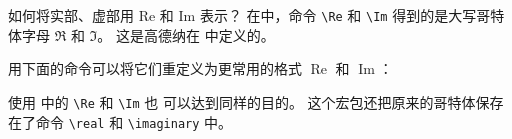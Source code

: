 \begin{myQA}{如何将实部、虚部用 Re 和 Im 表示？}
	在\LaTeXTeX 中，命令 \verb|\Re| 和 \verb|\Im| 得到的是大写哥特体字母
	$\Re$ 和 $\Im$。 
	这是高德纳在  中定义的。
	
	用下面的命令可以将它们重定义为更常用的格式 $\operatorname{Re}$
	和 $\operatorname{Im}$：
\begin{myCode}[|]
\renewcommand{\Re}{\operatorname{Re}}
\renewcommand{\Im}{\operatorname{Im}}
\end{myCode}
	
	使用   中的 \verb|\Re| 和 \verb|\Im| 也
	可以达到同样的目的。
	这个宏包还把原来的哥特体保存在了命令 \verb|\real| 和 \verb|\imaginary| 中。
	 
	
\end{myQA}